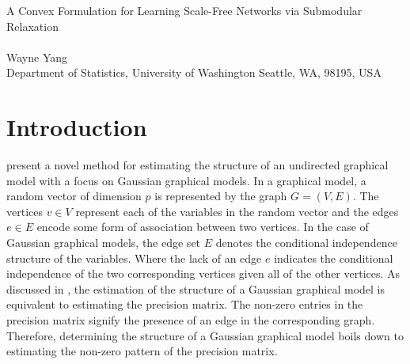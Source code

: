 \documentclass{uwstat572}
\theoremstyle{remark}
\theoremstyle{definition}
\begin{document}

\begin{center}
  {\LARGE A Convex Formulation for Learning Scale-Free Networks via Submodular Relaxation}\\\ \\
  {Wayne Yang \\ 
    Department of Statistics, University of Washington Seattle, WA, 98195, USA
  }
\end{center}



\begin{abstract}
  We examine a method to estimate the structure of graphical models when the structure is believed to be scale-free proposed by \cite{Defazio2012}.  We discuss its motivation, construction, and optimization before evaluating its performance against competing methods.  After replicating their experiments, we conduct a small number of further experiments to better understand the behavior of the method on both scale-free and non-scale-free graphical models.  We find that the sensitivity to tuning parameters remains an important obstacle to being able to use the method effectively in real world settings.
\end{abstract}

\section{Introduction}
\citet{Defazio2012} present a novel method for estimating the structure of an undirected graphical model with a focus on Gaussian graphical models. In a graphical model, a random vector of dimension $p$ is represented by the graph $G = (V,E)$.  The vertices $v \in V$ represent each of the variables in the random vector and the edges $e \in E$ encode some form of association between two vertices. In the case of Gaussian graphical models, the edge set $E$ denotes the conditional independence structure of the variables.  Where the lack of an edge $e$ indicates the conditional independence of the two corresponding vertices given all of the other vertices.  As discussed in \cite{dempster}, the estimation of the structure of a Gaussian graphical model is equivalent to estimating the precision matrix.  The non-zero entries in the precision matrix signify the presence of an edge in the corresponding graph.  
Therefore, determining the structure of a Gaussian graphical model boils down to 
estimating the non-zero pattern of the precision matrix. 
\end{document}
